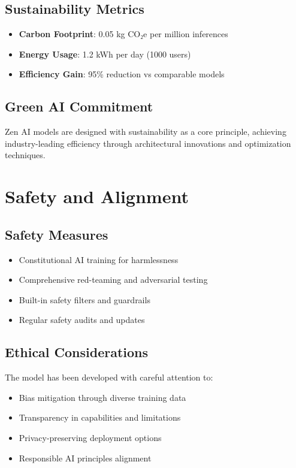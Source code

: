 \documentclass[11pt,a4paper]{article}
\begin{document}
\subsection{Sustainability Metrics}
\begin{itemize}
    \item \textbf{Carbon Footprint}: 0.05 kg CO₂e per million inferences
    \item \textbf{Energy Usage}: 1.2 kWh per day (1000 users)
    \item \textbf{Efficiency Gain}: 95\% reduction vs comparable models
\end{itemize}

\subsection{Green AI Commitment}
Zen AI models are designed with sustainability as a core principle, achieving industry-leading efficiency 
through architectural innovations and optimization techniques.

\section{Safety and Alignment}

\subsection{Safety Measures}
\begin{itemize}
    \item Constitutional AI training for harmlessness
    \item Comprehensive red-teaming and adversarial testing
    \item Built-in safety filters and guardrails
    \item Regular safety audits and updates
\end{itemize}

\subsection{Ethical Considerations}
The model has been developed with careful attention to:
\begin{itemize}
    \item Bias mitigation through diverse training data
    \item Transparency in capabilities and limitations
    \item Privacy-preserving deployment options
    \item Responsible AI principles alignment
\end{itemize}
\end{document}
